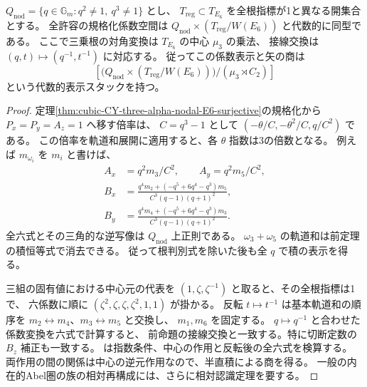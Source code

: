 \begin{corollary}\label{cor:cubic-CY-three-alpha-nodal-E6-relative-coordinates}
$Q_{\mathrm{nod}}=\{q\in\mathbb G_m:q^2\ne1,\ q^3\ne1\}$ とし、
$T_{\mathrm{reg}}\subset T_{E_6}$ を全根指標が1と異なる開集合とする。
全許容の規格化係数空間は $Q_{\mathrm{nod}}\times (T_{\mathrm{reg}}/W(E_6))$
と代数的に同型である。
ここで三乗根の対角変換は $T_{E_6}$ の中心 $\mu_3$ の乗法、
接線交換は $(q,t)\mapsto(q^{-1},t^{-1})$ に対応する。
従ってこの係数表示と矢の商は
\[
 \left[
   \bigl(Q_{\mathrm{nod}}\times (T_{\mathrm{reg}}/W(E_6))\bigr)
   /(\mu_3\rtimes C_2)
 \right]
\]
という代数的表示スタックを持つ。
\end{corollary}
\begin{proof}
定理\ref{thm:cubic-CY-three-alpha-nodal-E6-surjective}の規格化から
$P_x=P_y=A_z=1$ へ移す倍率は、
$C=q^3-1$ として $(-\theta/C,-\theta^2/C,q/C^2)$ である。
この倍率を軌道和展開に適用すると、各 $\theta$ 指数は3の倍数となる。
例えば $m_{\omega_i}$ を $m_i$ と書けば、
\[
\begin{aligned}
 A_x&=q^2m_3/C^2,\qquad A_y=q^2m_5/C^2,\\
 B_x&=\frac{q^4m_2+(-q^5+6q^4-q^3)m_5}{C^3(q-1)(q+1)^2},\\
 B_y&=\frac{q^4m_4+(-q^5+6q^4-q^3)m_3}{C^3(q-1)(q+1)^2}.
\end{aligned}
\]
全六式とその三角的な逆写像は $Q_{\mathrm{nod}}$ 上正則である。
$\omega_3+\omega_5$ の軌道和は前定理の積恒等式で消去できる。
従って根判別式を除いた後も全 $q$ で積の表示を得る。

三組の固有値における中心元の代表を
$(1,\zeta,\zeta^{-1})$ と取ると、その全根指標は1で、
六係数に順に $(\zeta^2,\zeta,\zeta,\zeta^2,1,1)$ が掛かる。
反転 $t\mapsto t^{-1}$ は基本軌道和の順序を
$m_2\leftrightarrow m_4$、$m_3\leftrightarrow m_5$ と交換し、
$m_1,m_6$ を固定する。
$q\mapsto q^{-1}$ と合わせた係数変換を六式で計算すると、
前命題の接線交換と一致する。特に切断定数の $B_z$ 補正も一致する。
は指数条件、中心の作用と反転後の全六式を検算する。
両作用の間の関係は中心の逆元作用なので、半直積による商を得る。
一般の内在的Abel圏の族の相対再構成には、さらに相対認識定理を要する。
\end{proof}
